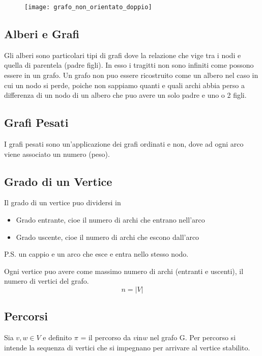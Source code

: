 \begin{figure}[H]
	\begin{center}
		\texttt{[image: grafo\_non\_orientato\_doppio]}
	\end{center}
\end{figure}


\subsection{Alberi e Grafi}

Gli alberi sono particolari tipi di grafi dove la relazione che vige tra i nodi e quella di parentela (padre figli). In esso i tragitti non sono infiniti come possono essere in un grafo.
Un grafo non puo essere ricostruito come un albero nel caso in cui un nodo si perde, poiche non sappiamo quanti e quali archi abbia perso a differenza di un nodo di un albero che puo avere un solo padre e uno o 2 figli.

\subsection{Grafi Pesati}
I grafi pesati sono un'applicazione dei grafi ordinati e non, dove ad ogni arco viene associato un numero (peso).

\subsection{Grado di un Vertice}

Il grado di un vertice puo dividersi in 
\begin{itemize}
	\item Grado entrante, cioe il numero di archi che entrano nell'arco
	\item Grado uscente, cioe il numero di archi che escono dall'arco
\end{itemize}

P.S. un cappio e un arco che esce e entra nello stesso nodo.

Ogni vertice puo avere come massimo numero di archi (entranti e uscenti), il numero di vertici del grafo.
$$n = |V|$$

\subsection{Percorsi}
Sia $v,w \in V$ e definito $\pi$ = il percorso da $v \text{in} w$ nel grafo G. Per percorso si intende la sequenza di vertici che si impegnano per arrivare al vertice stabilito. 


